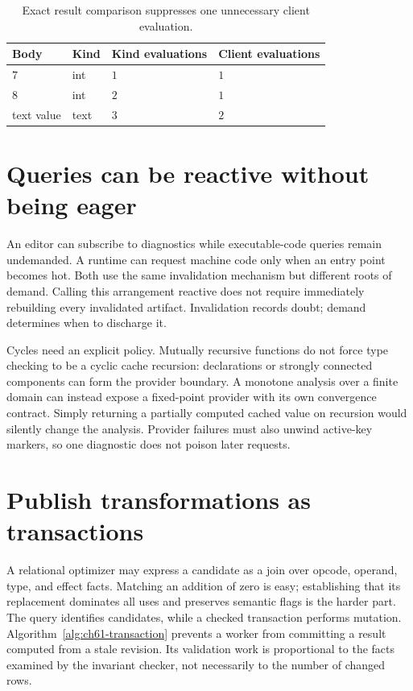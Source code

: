 \begin{table}[htbp]
\caption{Exact result comparison suppresses one unnecessary client evaluation.}
\label{tab:ch61-revisions}
\centering
\begin{tabular}{llll}
\toprule
Body & Kind & Kind evaluations & Client evaluations \\
\midrule
$7$ & int & $1$ & $1$ \\
$8$ & int & $2$ & $1$ \\
text value & text & $3$ & $2$ \\
\bottomrule
\end{tabular}
\end{table}

\section{Queries can be reactive without being eager}
\label{sec:ch61-reactive}

An editor can subscribe to diagnostics while executable-code queries remain undemanded.
A runtime can request machine code only when an entry point becomes hot.
Both use the same invalidation mechanism but different roots of demand.
Calling this arrangement reactive does not require immediately rebuilding every invalidated artifact.
Invalidation records doubt; demand determines when to discharge it.

Cycles need an explicit policy.
Mutually recursive functions do not force type checking to be a cyclic cache recursion: declarations or strongly connected components can form the provider boundary.
A monotone analysis over a finite domain can instead expose a fixed-point provider with its own convergence contract.
Simply returning a partially computed cached value on recursion would silently change the analysis.
Provider failures must also unwind active-key markers, so one diagnostic does not poison later requests.

\section{Publish transformations as transactions}
\label{sec:ch61-transactions}

A relational optimizer may express a candidate as a join over opcode, operand, type, and effect facts.
Matching an addition of zero is easy; establishing that its replacement dominates all uses and preserves semantic flags is the harder part.
The query identifies candidates, while a checked transaction performs mutation.
Algorithm~\ref{alg:ch61-transaction} prevents a worker from committing a result computed from a stale revision.
Its validation work is proportional to the facts examined by the invariant checker, not necessarily to the number of changed rows.

